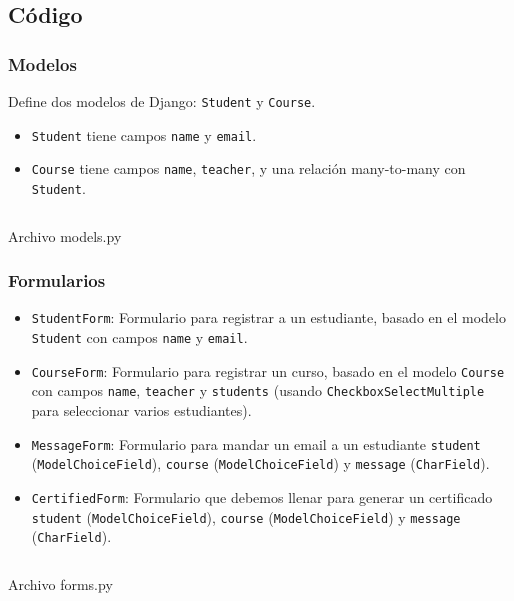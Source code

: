 \documentclass{article}
\newenvironment{block}{\captionsetup{type=listing}}{}
\begin{document}
\subsection{Código}
\subsubsection{Modelos}
Define dos modelos de Django: \texttt{Student} y \texttt{Course}.
\begin{itemize}
	\item \texttt{Student} tiene campos \texttt{name} y \texttt{email}.
	\item \texttt{Course} tiene campos \texttt{name}, \texttt{teacher}, y una relación many-to-many con \texttt{Student}.
\end{itemize}
\begin{block}
	\inputminted{python}{../Course_Management_System/systemM/models.py}
	\caption{Archivo models.py}
\end{block}

\subsubsection{Formularios}
\begin{itemize}
	\item \texttt{StudentForm}: Formulario para registrar a un estudiante, basado en el modelo \texttt{Student} con campos \texttt{name} y \texttt{email}.
	\item \texttt{CourseForm}: Formulario para registrar un curso, basado en el modelo \texttt{Course} con campos \texttt{name}, \texttt{teacher} y \texttt{students} (usando \texttt{CheckboxSelectMultiple} para seleccionar varios estudiantes).
	\item \texttt{MessageForm}: Formulario para mandar un email a un estudiante \texttt{student} (\texttt{ModelChoiceField}), \texttt{course} (\texttt{ModelChoiceField}) y \texttt{message} (\texttt{CharField}).
	\item \texttt{CertifiedForm}: Formulario que debemos llenar para generar un certificado \texttt{student} (\texttt{ModelChoiceField}), \texttt{course} (\texttt{ModelChoiceField}) y \texttt{message} (\texttt{CharField}).
\end{itemize}
\begin{block}
	\inputminted{python}{../Course_Management_System/systemM/forms.py}
	\caption{Archivo forms.py}
\end{block}
\end{document}
